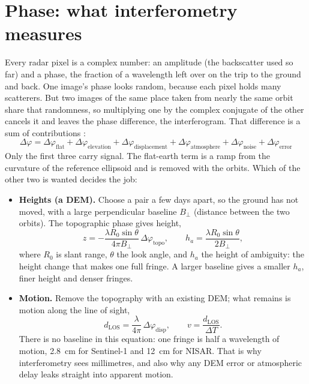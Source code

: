 \section{Phase: what interferometry measures}
Every radar pixel is a complex number: an amplitude (the backscatter used so far) and a phase, the fraction of a wavelength left over on the trip to the ground and back. One image's phase looks random, because each pixel holds many scatterers. But two images of the same place taken from nearly the same orbit share that randomness, so multiplying one by the complex conjugate of the other cancels it and leaves the phase difference, the interferogram. That difference is a sum of contributions \cite{hanssen2001}:
\begin{equation}
\Delta\varphi = \Delta\varphi_{\mathrm{flat}} + \Delta\varphi_{\mathrm{elevation}} + \Delta\varphi_{\mathrm{displacement}} + \Delta\varphi_{\mathrm{atmosphere}} + \Delta\varphi_{\mathrm{noise}} + \Delta\varphi_{\mathrm{error}}
\end{equation}
Only the first three carry signal. The flat-earth term is a ramp from the curvature of the reference ellipsoid and is removed with the orbits. Which of the other two is wanted decides the job:
\begin{itemize}
\item \textbf{Heights (a DEM).} Choose a pair a few days apart, so the ground has not moved, with a large perpendicular baseline $B_\perp$ (distance between the two orbits). The topographic phase gives height,
\begin{equation}
z = -\frac{\lambda R_0 \sin\theta}{4\pi B_\perp}\,\Delta\varphi_{\mathrm{topo}}, \qquad h_a = \frac{\lambda R_0 \sin\theta}{2 B_\perp},
\end{equation}
where $R_0$ is slant range, $\theta$ the look angle, and $h_a$ the height of ambiguity: the height change that makes one full fringe. A larger baseline gives a smaller $h_a$, finer height and denser fringes.
\item \textbf{Motion.} Remove the topography with an existing DEM; what remains is motion along the line of sight,
\begin{equation}
d_{\mathrm{LOS}} = \frac{\lambda}{4\pi}\,\Delta\varphi_{\mathrm{disp}}, \qquad v = \frac{d_{\mathrm{LOS}}}{\Delta T}.
\end{equation}
There is no baseline in this equation: one fringe is half a wavelength of motion, 2.8~cm for Sentinel-1 and 12~cm for NISAR. That is why interferometry sees millimetres, and also why any DEM error or atmospheric delay leaks straight into apparent motion.
\end{itemize}

